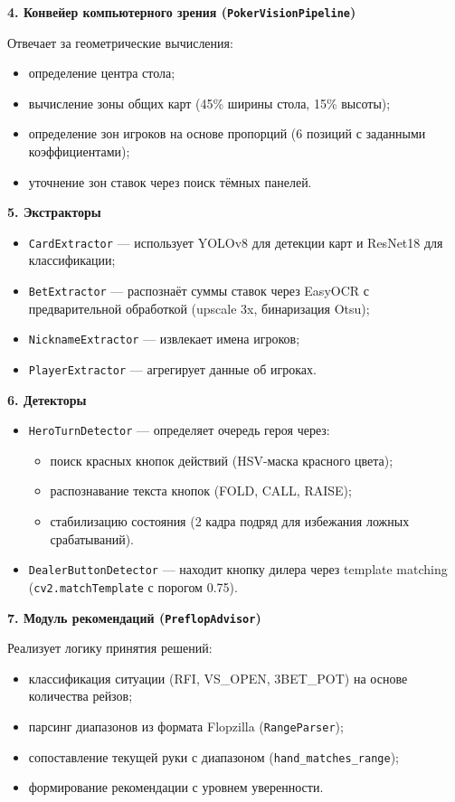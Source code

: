 \textbf{4. Конвейер компьютерного зрения (\texttt{PokerVisionPipeline})}

Отвечает за геометрические вычисления:
\begin{itemize}
    \item определение центра стола;
    \item вычисление зоны общих карт (45\% ширины стола, 15\% высоты);
    \item определение зон игроков на основе пропорций (6 позиций с заданными коэффициентами);
    \item уточнение зон ставок через поиск тёмных панелей.
\end{itemize}

\textbf{5. Экстракторы}

\begin{itemize}
    \item \texttt{CardExtractor} --- использует YOLOv8 для детекции карт и ResNet18 для классификации;
    \item \texttt{BetExtractor} --- распознаёт суммы ставок через EasyOCR с предварительной обработкой (upscale 3x, бинаризация Otsu);
    \item \texttt{NicknameExtractor} --- извлекает имена игроков;
    \item \texttt{PlayerExtractor} --- агрегирует данные об игроках.
\end{itemize}

\textbf{6. Детекторы}

\begin{itemize}
    \item \texttt{HeroTurnDetector} --- определяет очередь героя через:
    \begin{itemize}
        \item поиск красных кнопок действий (HSV-маска красного цвета);
        \item распознавание текста кнопок (FOLD, CALL, RAISE);
        \item стабилизацию состояния (2 кадра подряд для избежания ложных срабатываний).
    \end{itemize}
    \item \texttt{DealerButtonDetector} --- находит кнопку дилера через template matching (\texttt{cv2.matchTemplate} с порогом 0.75).
\end{itemize}

\textbf{7. Модуль рекомендаций (\texttt{PreflopAdvisor})}

Реализует логику принятия решений:
\begin{itemize}
    \item классификация ситуации (RFI, VS\_OPEN, 3BET\_POT) на основе количества рейзов;
    \item парсинг диапазонов из формата Flopzilla (\texttt{RangeParser});
    \item сопоставление текущей руки с диапазоном (\texttt{hand\_matches\_range});
    \item формирование рекомендации с уровнем уверенности.
\end{itemize}


